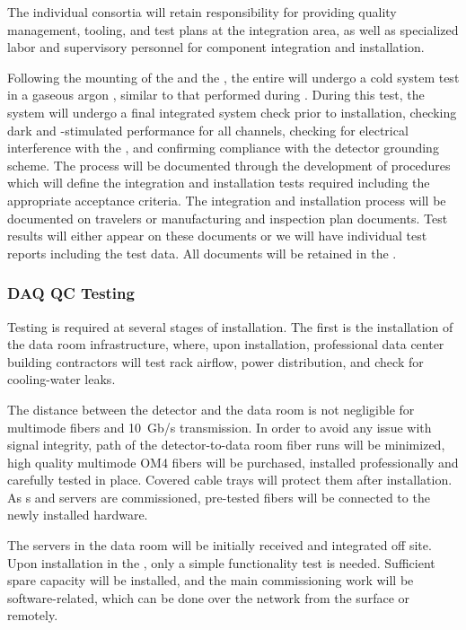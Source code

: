The individual consortia will retain responsibility for providing quality management, tooling, and test plans at the integration area, as well as specialized labor and supervisory personnel for component integration and installation.

Following the mounting of the   and the , the entire  will undergo a cold system test in a gaseous argon \coldbox, similar to that performed during . During this test, the system will undergo a final integrated system check prior to installation, checking dark and -stimulated  performance for all channels, checking for electrical interference with the , and confirming compliance with the detector grounding scheme.
The  process will be documented through the development of procedures which will define the integration and installation tests required including the appropriate acceptance criteria. 
The integration and installation process will be documented on travelers or manufacturing and inspection plan documents. 
Test results will either appear on these documents or we will have individual test reports including the test data. 
All documents will be retained in the .



\subsubsection{DAQ QC Testing}

Testing is required at several stages of  installation.  The first is the installation of the data room infrastructure, where, upon installation, professional data center building contractors will test rack airflow, power distribution, and check for cooling-water leaks.

The distance between the detector and the data room is not negligible for multimode fibers and \SI{10}{Gb/s} transmission. 
In order to avoid any issue with signal integrity, path of the detector-to-data room fiber runs will be minimized, high quality multimode OM4 fibers will be purchased, installed professionally and carefully tested in place.
Covered cable trays will protect them after installation.  As s and servers are commissioned, pre-tested fibers will be connected to the newly installed hardware.

The  servers in the  data room will be initially received and integrated off site.  Upon installation in the , only a simple functionality test is needed.  Sufficient spare capacity will be installed, and the main commissioning work will be software-related, which can be done over the network from the surface or remotely.

